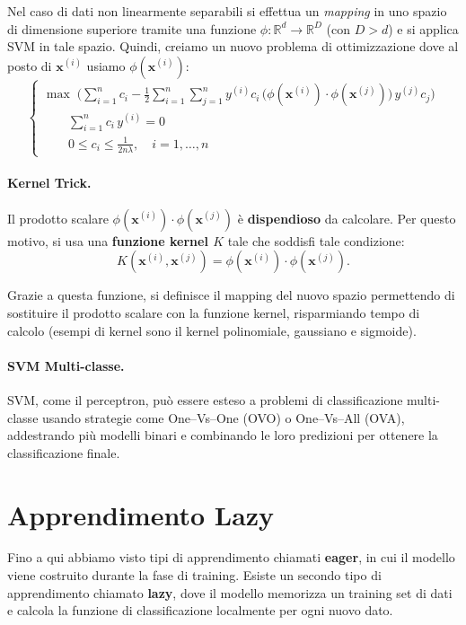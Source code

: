 Nel caso di dati non linearmente separabili si effettua un \emph{mapping} in uno spazio di dimensione superiore tramite una funzione $\phi:\mathbb{R}^d\to\mathbb{R}^D$ (con $D>d$) e si applica SVM in tale spazio. Quindi, creiamo un nuovo problema di ottimizzazione dove al posto di $\mathbf{x}^{(i)}$ usiamo $\phi(\mathbf{x}^{(i)})$:
\[
\begin{cases}
\displaystyle\max\;\Biggl(\sum_{i=1}^n c_i - \tfrac{1}{2}\sum_{i=1}^n\sum_{j=1}^n y^{(i)} c_i\,\bigl(\phi(\mathbf{x}^{(i)})\!\cdot\!\phi(\mathbf{x}^{(j)})\bigr)\,y^{(j)} c_j\Biggr)\\[6pt]
\qquad \displaystyle\sum_{i=1}^n c_i\,y^{(i)} = 0\\[6pt]
\qquad 0 \le c_i \le \frac{1}{2n\lambda},\quad i=1,\dots,n
\end{cases}
\]

\paragraph{Kernel Trick.} Il prodotto scalare \(\phi(\mathbf{x}^{(i)})\cdot\phi(\mathbf{x}^{(j)})\) è \textbf{dispendioso} da calcolare. Per questo motivo, si usa una \textbf{funzione kernel $K$} tale che soddisfi tale condizione:
\[
K(\mathbf{x}^{(i)},\mathbf{x}^{(j)}) = \phi(\mathbf{x}^{(i)})\cdot\phi(\mathbf{x}^{(j)}).
\]

Grazie a questa funzione, si definisce il mapping del nuovo spazio permettendo di sostituire il prodotto scalare con la funzione kernel, risparmiando tempo di calcolo (esempi di kernel sono il kernel polinomiale, gaussiano e sigmoide).

\paragraph{SVM Multi-classe.} SVM, come il perceptron, può essere esteso a problemi di classificazione multi-classe usando strategie come One–Vs–One (OVO) o One–Vs–All (OVA), addestrando più modelli binari e combinando le loro predizioni per ottenere la classificazione finale.

\section{Apprendimento Lazy}
Fino a qui abbiamo visto tipi di apprendimento chiamati \textbf{eager}, in cui il modello viene costruito durante la fase di training.  Esiste un secondo tipo di apprendimento chiamato \textbf{lazy}, dove il modello memorizza un training set di dati e calcola la funzione di classificazione localmente per ogni nuovo dato.

